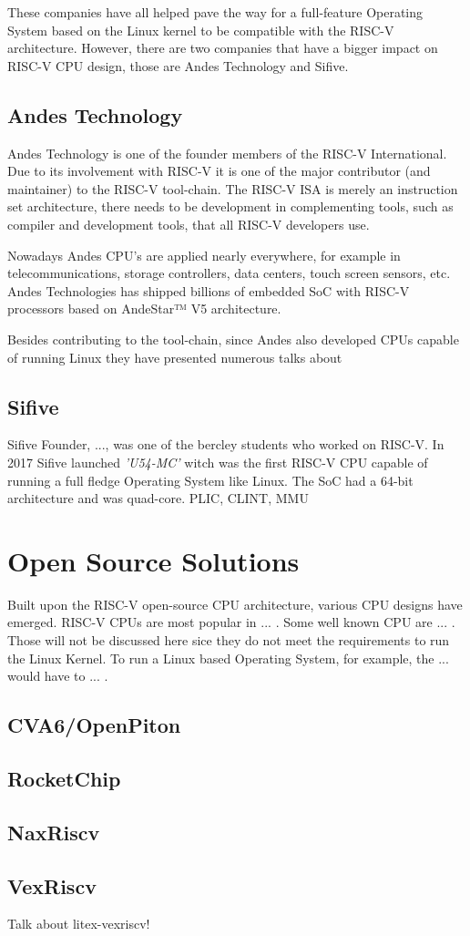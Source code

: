 These companies have all helped pave the way for a full-feature Operating System based on the Linux kernel to be compatible with the RISC-V architecture. However, there are two companies that have a bigger impact on RISC-V CPU design, those are Andes Technology and Sifive.

\subsection{Andes Technology}
Andes Technology is one of the founder members of the RISC-V International. Due to its involvement with RISC-V it is one of the major contributor (and maintainer) to the RISC-V tool-chain. The RISC-V ISA is merely an instruction set architecture, there needs to be development in complementing tools, such as compiler and development tools, that all RISC-V developers use.

Nowadays Andes CPU's are applied nearly everywhere, for example in telecommunications, storage controllers, data centers, touch screen sensors, etc. Andes Technologies has shipped billions of embedded SoC with RISC-V processors based on AndeStar™ V5 architecture. 

Besides contributing to the tool-chain, since Andes also developed CPUs capable of running Linux they have presented numerous talks about

\subsection{Sifive}
Sifive Founder, ..., was one of the bercley students who worked on RISC-V.
In 2017 Sifive launched \textit{'U54-MC'} witch was the first RISC-V CPU capable of running a full fledge Operating System like Linux. The SoC had a 64-bit architecture and was quad-core.
PLIC, CLINT, MMU


\section{Open Source Solutions}
Built upon the RISC-V open-source CPU architecture, various CPU designs have emerged. RISC-V CPUs are most popular in ... . Some well known CPU are ... . Those will not be discussed here sice they do not meet the requirements to run the Linux Kernel. To run a Linux based Operating System, for example, the ... would have to ... .

\subsection{CVA6/OpenPiton}
\subsection{RocketChip}
\subsection{NaxRiscv}
\subsection{VexRiscv}

Talk about litex-vexriscv!